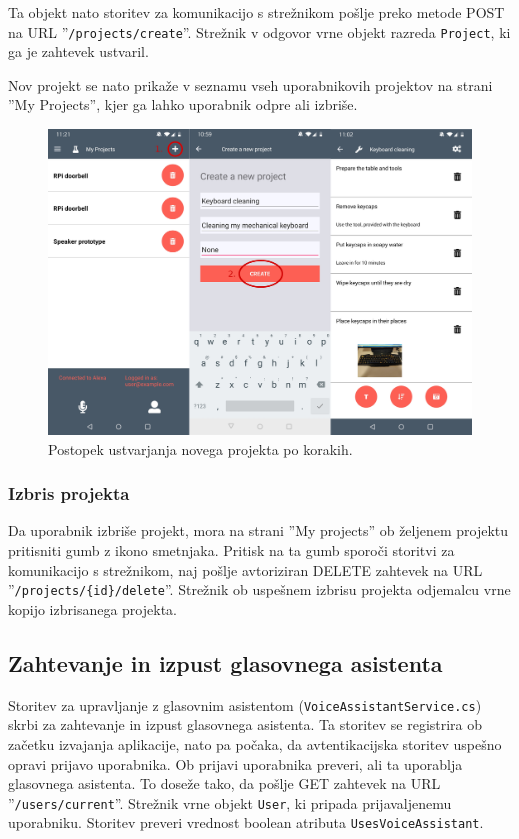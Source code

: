 \documentclass[a4paper, 12pt]{book}
\begin{document}
Ta objekt nato storitev za komunikacijo s strežnikom pošlje preko metode POST na URL ''\texttt{/projects/create}''.
Strežnik v odgovor vrne objekt razreda \texttt{Project}, ki ga je zahtevek ustvaril.

Nov projekt se nato prikaže v seznamu vseh uporabnikovih projektov na strani ''My Projects'', kjer ga lahko uporabnik odpre ali izbriše.

\begin{figure}[H]
\begin{center}
\includegraphics[width=13cm]{app_newproject}
\end{center}
	\caption{Postopek ustvarjanja novega projekta po korakih.}
\label{app_newproject}
\end{figure}

\subsubsection{Izbris projekta}

Da uporabnik izbriše projekt, mora na strani ''My projects'' ob željenem projektu pritisniti gumb z ikono smetnjaka.
Pritisk na ta gumb sporoči storitvi za komunikacijo s strežnikom, naj pošlje avtoriziran DELETE zahtevek na URL ''\texttt{/projects/\{id\}/delete}''.
Strežnik ob uspešnem izbrisu projekta odjemalcu vrne kopijo izbrisanega projekta.

\subsection{Zahtevanje in izpust glasovnega asistenta}
Storitev za upravljanje z glasovnim asistentom (\texttt{VoiceAssistantService.cs}) skrbi za zahtevanje in izpust glasovnega asistenta.
Ta storitev se registrira ob začetku izvajanja aplikacije, nato pa počaka, da avtentikacijska storitev uspešno opravi prijavo uporabnika.
Ob prijavi uporabnika preveri, ali ta uporablja glasovnega asistenta.
To doseže tako, da pošlje GET zahtevek na URL ''\texttt{/users/current}''.
Strežnik vrne objekt \texttt{User}, ki pripada prijavaljenemu uporabniku.
Storitev preveri vrednost boolean atributa \texttt{UsesVoiceAssistant}.
\end{document}
